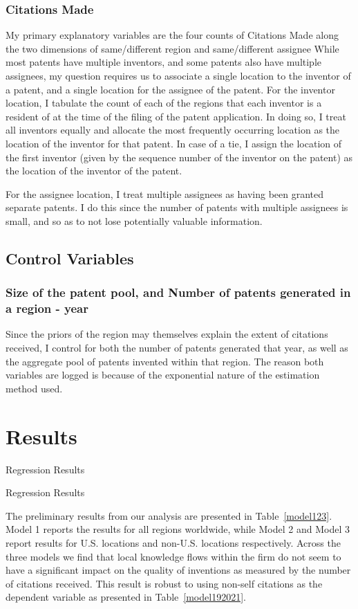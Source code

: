 \documentclass[12pt]{article}
\begin{document}
\subsubsection{Citations Made}
My primary explanatory variables are the four counts of Citations Made along the two dimensions of same/different region and same/different assignee
While most patents have multiple inventors, and some patents also have multiple assignees, my question requires us to associate a single location to the inventor of a patent, and a single location for the assignee of the patent. For the inventor location, I tabulate the count of each of the regions that each inventor is a resident of at the time of the filing of the patent application. In doing so, I treat all inventors equally and allocate the most frequently occurring location as the location of the inventor for that patent. In case of a tie, I assign the location of the first inventor (given by the sequence number of the inventor on the patent) as the location of the inventor of the patent. 

For the assignee location, I treat multiple assignees as having been granted separate patents. I do this since the number of patents with multiple assignees is small, and so as to not lose potentially valuable information.

\subsection{Control Variables}
\subsubsection{Size of the patent pool, and Number of patents generated in a region - year}
Since the priors of the region may themselves explain the extent of citations received, I control for both the number of patents generated that year, as well as the aggregate pool of patents invented within that region. The reason both variables are logged is because of the exponential nature of the estimation method used.

\section{Results}
\begin{table}
\caption{Regression Results}

\label{RR}
\end{table}

\begin{table}
\caption{Regression Results}

\label{RT}
\end{table}
The preliminary results from our analysis are presented in Table~\ref{model123}. Model 1 reports the results for all regions worldwide, while Model 2 and Model 3 report results for U.S. locations and non-U.S. locations respectively. Across the three models we find that local knowledge flows within the firm do not seem to have a significant impact on the quality of inventions as measured by the number of citations received. This result is robust to using non-self citations as the dependent variable as presented in Table~\ref{model192021}. \par
\end{document}
